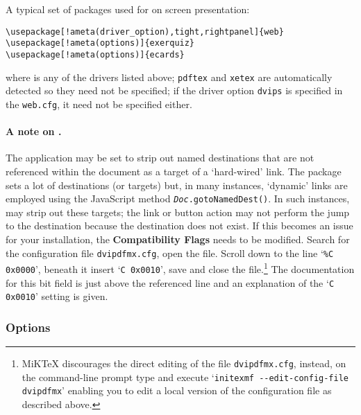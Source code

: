 \documentclass{article}
\begin{document}
A typical set of packages used for on screen presentation:
\begin{Verbatim}[xleftmargin=\amtIndent,commandchars=!()]
\usepackage[!ameta(driver_option),tight,rightpanel]{web}
\usepackage[!ameta(options)]{exerquiz}
\usepackage[!ameta(options)]{ecards}
\end{Verbatim}
where  is any of the drivers listed above;
\texttt{pdftex} and \texttt{xetex} are automatically detected so they need
not be specified; if the driver option \texttt{dvips} is specified in the
\texttt{web.cfg},  it need not be specified either.

\paragraph*{A note on .}
The  application may be set to strip out named destinations that
are not referenced within the document as a target of a `hard-wired' link.
The  package sets a lot of destinations (or targets) but, in many
instances, `dynamic' links are employed using the JavaScript method
\texttt{\textsl{Doc}.gotoNamedDest()}. In such instances,
 may strip out these targets; the link or button action may not
perform the jump to the destination because the destination does not exist.
If this becomes an issue for your  installation, the
\textbf{ Compatibility Flags} needs to be modified. Search for
the configuration file \texttt{dvipdfmx.cfg}, open the file. Scroll down to
the line `\texttt{\%C  0x0000}', beneath it insert `\texttt{C  0x0010}', save
and close the file.\footnote{MiK\TeX{} discourages the direct editing of the
file \texttt{dvipdfmx.cfg}, instead, on the command-line prompt type and
execute `\texttt{initexmf -{}-edit-config-file dvipdfmx}' enabling you to edit
a local version of the configuration file as described above.} The
documentation for this bit field is just above the referenced line and an
explanation of the `\texttt{C 0x0010}' setting is given.


\subsubsection{Options}
\end{document}
